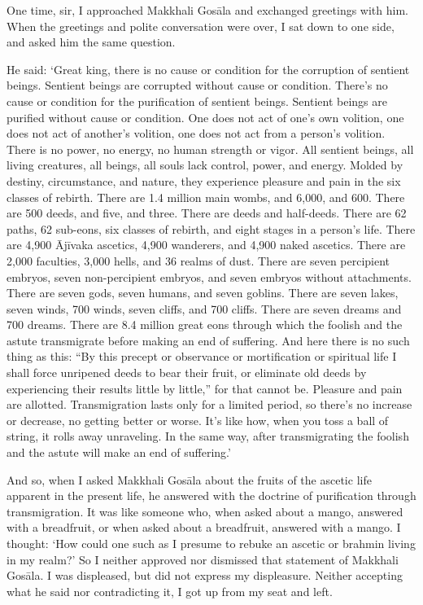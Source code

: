 \documentclass[12pt,openany]{book}%
\begin{document}
One time, sir, I approached Makkhali \textsanskrit{Gosāla} and exchanged greetings with him. When the greetings and polite conversation were over, I sat down to one side, and asked him the same question. 

He said: ‘Great king, there is no cause or condition for the corruption of sentient beings. Sentient beings are corrupted without cause or condition. There’s no cause or condition for the purification of sentient beings. Sentient beings are purified without cause or condition. One does not act of one’s own volition, one does not act of another’s volition, one does not act from a person’s volition. There is no power, no energy, no human strength or vigor. All sentient beings, all living creatures, all beings, all souls lack control, power, and energy. Molded by destiny, circumstance, and nature, they experience pleasure and pain in the six classes of rebirth. There are 1.4 million main wombs, and 6,000, and 600. There are 500 deeds, and five, and three. There are deeds and half-deeds. There are 62 paths, 62 sub-eons, six classes of rebirth, and eight stages in a person’s life. There are 4,900 \textsanskrit{Ājīvaka} ascetics, 4,900 wanderers, and 4,900 naked ascetics. There are 2,000 faculties, 3,000 hells, and 36 realms of dust. There are seven percipient embryos, seven non-percipient embryos, and seven embryos without attachments. There are seven gods, seven humans, and seven goblins. There are seven lakes, seven winds, 700 winds, seven cliffs, and 700 cliffs. There are seven dreams and 700 dreams. There are 8.4 million great eons through which the foolish and the astute transmigrate before making an end of suffering. And here there is no such thing as this: “By this precept or observance or mortification or spiritual life I shall force unripened deeds to bear their fruit, or eliminate old deeds by experiencing their results little by little,” for that cannot be. Pleasure and pain are allotted. Transmigration lasts only for a limited period, so there’s no increase or decrease, no getting better or worse. It’s like how, when you toss a ball of string, it rolls away unraveling. In the same way, after transmigrating the foolish and the astute will make an end of suffering.’ 

And so, when I asked Makkhali \textsanskrit{Gosāla} about the fruits of the ascetic life apparent in the present life, he answered with the doctrine of purification through transmigration. It was like someone who, when asked about a mango, answered with a breadfruit, or when asked about a breadfruit, answered with a mango. I thought: ‘How could one such as I presume to rebuke an ascetic or brahmin living in my realm?’ So I neither approved nor dismissed that statement of Makkhali \textsanskrit{Gosāla}. I was displeased, but did not express my displeasure. Neither accepting what he said nor contradicting it, I got up from my seat and left. 
\end{document}
